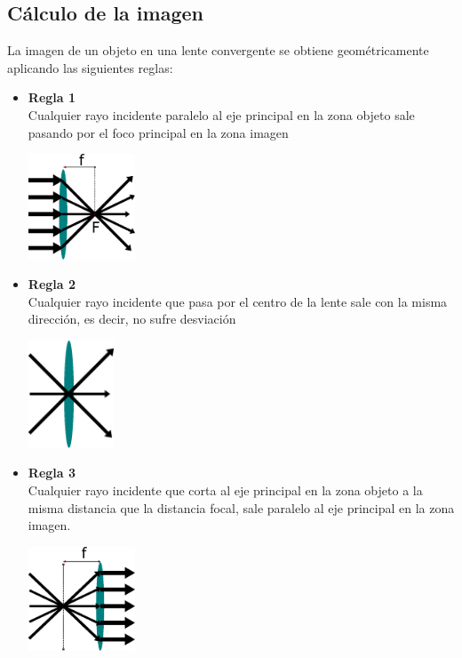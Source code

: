 \subsection{Cálculo de la imagen}
La imagen de un objeto en una lente convergente se obtiene geométricamente aplicando las siguientes reglas:
\begin{itemize}
	\item \textbf{Regla 1}\\
	      Cualquier rayo incidente paralelo al eje principal en la zona objeto sale pasando por el foco principal en la zona imagen
	      \begin{center}
		      \includegraphics[width=0.25\textwidth]{Contenido/Cuerpo/Capitulo2/Fig1_7.eps}
		      \label{fig:MarcoTeorico:Fig7}

	      \end{center}
	\item \textbf{Regla 2}\\
	      Cualquier rayo incidente que pasa por el centro de la lente sale con la misma dirección, es decir, no sufre desviación
	      \begin{center}
		      \includegraphics[width=0.2\textwidth]{Contenido/Cuerpo/Capitulo2/Fig1_8.eps}
		      \label{fig:MarcoTeorico:Fig8}
	      \end{center}
	\item \textbf{Regla 3}\\
	      Cualquier rayo incidente que corta al eje principal en la zona objeto a la misma distancia que la distancia focal, sale
	      paralelo al eje principal en la zona imagen.
	      \begin{center}
		      \includegraphics[width=0.25\textwidth]{Contenido/Cuerpo/Capitulo2/Fig1_9.eps}
		      \label{fig:MarcoTeorico:Fig9}
	      \end{center}

\end{itemize}
